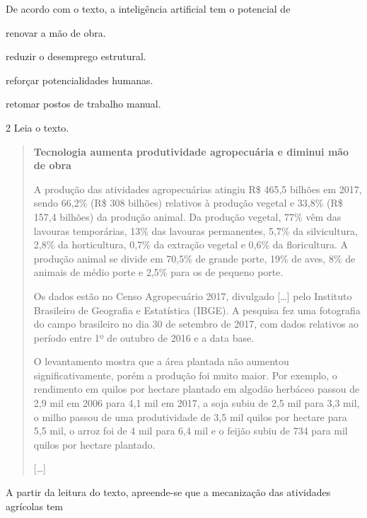 De acordo com o texto, a inteligência artificial tem o potencial de

\begin{escolha}
\item
  renovar a mão de obra.
\item
  reduzir o desemprego estrutural.
\item
  reforçar potencialidades humanas.
\item
  retomar postos de trabalho manual.
\end{escolha}

\num{2} Leia o texto.

\begin{quote}
\textbf{Tecnologia aumenta produtividade agropecuária e diminui mão de obra}

A produção das atividades agropecuárias atingiu R\$ 465,5 bilhões em
2017, sendo 66,2\% (R\$ 308 bilhões) relativos à produção vegetal e
33,8\% (R\$ 157,4 bilhões) da produção animal. Da produção vegetal, 77\%
vêm das lavouras temporárias, 13\% das lavouras permanentes, 5,7\% da
silvicultura, 2,8\% da horticultura, 0,7\% da extração vegetal e 0,6\%
da floricultura. A produção animal se divide em 70,5\% de grande porte,
19\% de aves, 8\% de animais de médio porte e 2,5\% para os de pequeno
porte.

Os dados estão no Censo Agropecuário 2017, divulgado {[}\ldots{}{]} pelo
Instituto Brasileiro de Geografia e Estatística (IBGE). A pesquisa fez
uma fotografia do campo brasileiro no dia 30 de setembro de 2017, com
dados relativos ao período entre 1º de outubro de 2016 e a data base.

O levantamento mostra que a área plantada não aumentou
significativamente, porém a produção foi muito maior. Por exemplo, o
rendimento em quilos por hectare plantado em algodão herbáceo passou de
2,9 mil em 2006 para 4,1 mil em 2017, a soja subiu de 2,5 mil para 3,3
mil, o milho passou de uma produtividade de 3,5 mil quilos por hectare
para 5,5 mil, o arroz foi de 4 mil para 6,4 mil e o feijão subiu de 734
para mil quilos por hectare plantado.

{[}\ldots{}{]}

\end{quote}

A partir da leitura do texto, apreende-se que a mecanização das
atividades agrícolas tem

